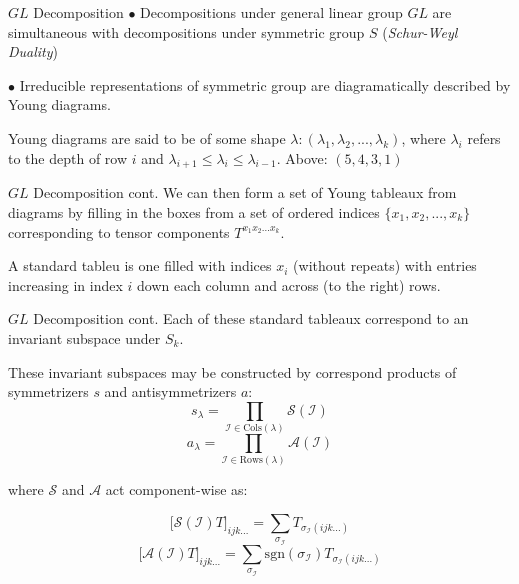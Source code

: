 \documentclass[11pt]{beamer}
\begin{document}
\begin{frame}{$GL$ Decomposition}
$\bullet$ Decompositions under general linear group $GL$ are simultaneous with decompositions under symmetric group $S$ (\textit{Schur-Weyl Duality})

\medskip

$\bullet$ Irreducible representations of symmetric group are diagramatically described by Young diagrams.

\begin{center}
\end{center}
Young diagrams  are said to be of some shape $\lambda:(\lambda_1,\lambda_2,...,\lambda_k)$, where $\lambda_i$ refers to the depth of row $i$ and $\lambda_{i+1}\leq\lambda_i\leq\lambda_{i-1}$. Above: $(5,4,3,1)$
\end{frame}
\begin{frame}{$GL$ Decomposition cont.}
We can then form a set of Young tableaux from diagrams by filling in the boxes from a set of ordered indices $\lbrace x_1,x_2,...,x_k\rbrace$ corresponding to tensor components $T^{x_1x_2...x_k}$. 
\begin{center}
\end{center}
A standard tableu is one filled with indices $x_i$ (without repeats) with entries increasing in index $i$ down each column and across (to the right) rows.
\end{frame}

\begin{frame}{$GL$ Decomposition cont.}
Each of these standard tableaux correspond to an invariant subspace under $S_k$.

\medskip

These invariant subspaces may be constructed by correspond products of symmetrizers $s$ and antisymmetrizers $a$:
$$
s_{\lambda} = \prod_{\mathcal{I}\in \text{Cols}(\lambda)}\mathcal{S}(\mathcal{I})
$$
$$
a_{\lambda} = \prod_{\mathcal{I}\in \text{Rows}(\lambda)}\mathcal{A}(\mathcal{I})
$$
\begin{center}
where $\mathcal{S}$ and $\mathcal{A}$ act component-wise as:
\end{center}
$$
\big[\mathcal{S}(\mathcal{I})T\big]_{ijk...}= \sum_{\sigma_{\mathcal{I}}}T_{\sigma_{\mathcal{I}}(ijk...)}
$$
$$
\big[\mathcal{A}(\mathcal{I})T\big]_{ijk...}= \sum_{\sigma_{\mathcal{I}}}\text{sgn}(\sigma_{\mathcal{I}})T_{\sigma_{\mathcal{I}}(ijk...)}
$$
\end{frame}
\end{document}
